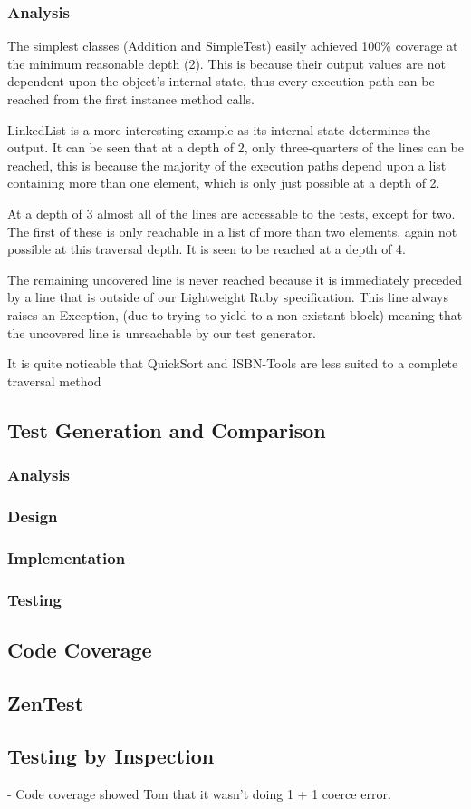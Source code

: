 \subsubsection{Analysis}
  The simplest classes (Addition and SimpleTest) easily achieved 100\% coverage at the minimum reasonable depth (2). This is because their output values are not dependent upon the object's internal state, thus every execution path can be reached from the first instance method calls.

  LinkedList is a more interesting example as its internal state determines the output. It can be seen that at a depth of 2, only three-quarters of the lines can be reached, this is because the majority of the execution paths depend upon a list containing more than one element, which is only just possible at a depth of 2.

  At a depth of 3 almost all of the lines are accessable to the tests, except for two. The first of these is only reachable in a list of more than two elements, again not possible at this traversal depth. It is seen to be reached at a depth of 4.

  The remaining uncovered line is never reached because it is immediately preceded by a line that is outside of our Lightweight Ruby specification. This line always raises an Exception, (due to trying to yield to a non-existant block) meaning that the uncovered line is unreachable by our test generator.

  It is quite noticable that QuickSort and ISBN-Tools are less suited to a complete traversal method 

  \subsection{Test Generation and Comparison}
    \subsubsection{Analysis}
    \subsubsection{Design}
    \subsubsection{Implementation}
    \subsubsection{Testing}
  \subsection{Code Coverage}
  \subsection{ZenTest}
  \subsection{Testing by Inspection}
  - Code coverage showed Tom that it wasn't doing 1 + 1 coerce error.

